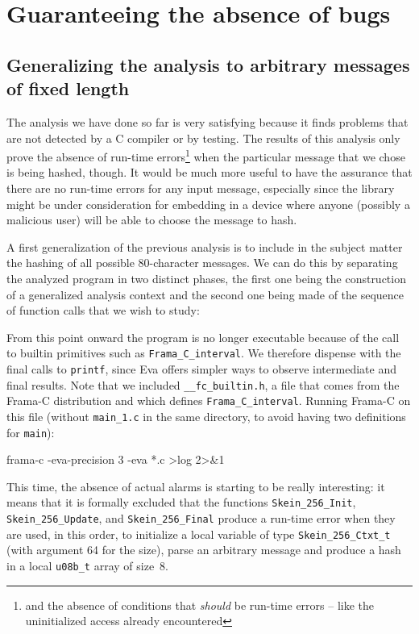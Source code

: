 \documentclass[web]{frama-c-book}
\newcommand{\Eva}{\textsf{Eva}}
\begin{document}
\section{Guaranteeing the absence of bugs}

\subsection{Generalizing the analysis to arbitrary messages of fixed length}

The analysis we have done so far is very satisfying because
it finds problems that are not detected by a C compiler or by testing.
The results of this analysis only prove 
the absence of run-time errors\footnote{and the absence
of conditions that
{\em should} be run-time errors -- like the uninitialized access already
encountered} when the particular message that we
chose is being hashed, though.
It would be much more useful to have the assurance that there are
no run-time errors for any input message, especially since the library
might be under consideration for embedding in a device where anyone
(possibly a malicious user) will be able to choose the message
to hash.

A first generalization of the previous analysis  is to include
in the subject matter
the hashing of all possible 80-character messages. We can do this
by separating the analyzed program in two distinct phases, the first
one being the construction of a generalized analysis context
and the second one being made of the sequence of function calls
that we wish to study:


From this point onward the program is no longer executable because
of the call to builtin primitives such as \lstinline|Frama_C_interval|.
We therefore dispense with the final calls to \lstinline|printf|,
since \Eva{} offers simpler ways to observe intermediate
and final results. Note that we included \verb|__fc_builtin.h|, a file
that comes from the Frama-C distribution and which 
defines \lstinline|Frama_C_interval|. Running Frama-C on this
file (without \verb|main_1.c| in the same directory, to avoid having two
definitions for \verb|main|):
\begin{shell}
frama-c -eva-precision 3 -eva *.c >log 2>&1
\end{shell}

This time, the absence of actual alarms is starting to be really interesting:
it means that it is formally excluded that the functions
\lstinline|Skein_256_Init|, \lstinline|Skein_256_Update|, and
\lstinline|Skein_256_Final| produce a run-time error when
they are used, in this order, to initialize a local variable
of type \lstinline|Skein_256_Ctxt_t| (with argument 64 for the size),
parse an arbitrary message and produce a hash in a local \lstinline|u08b_t|
array of size~8.
\end{document}
